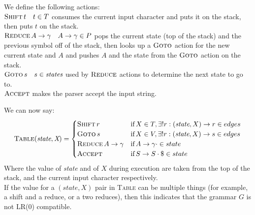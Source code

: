 \documentclass{article}
\begin{document}
	 We define the following actions:\\
	 $\textsc{Shift} \, t \hspace{1em} t \in T$ consumes the current input character and puts it on the stack, then puts $t$ on the stack.\\
	 $\textsc{Reduce} \, A \rightarrow \gamma \hspace{1em} A \rightarrow \gamma \in P$ pops the current state (top of the stack) and the previous symbol off of the stack, then looks up a $\textsc{Goto}$ action for the new current state and $A$ and pushes $A$ and the state from the $\textsc{Goto}$ action on the stack.\\
	 $\textsc{Goto} \, s \hspace{1em} s \in \textit{states}$ used by $\textsc{Reduce}$ actions to determine the next state to go to.\\
	 $\textsc{Accept}$ makes the parser accept the input string.
	 
	 We can now say:
	 $$
	 \textsc{Table}(\textit{state}, \textit{X}) =
	 \begin{cases}
	 \textsc{Shift} \, r & \textrm{if} \, X \in T, \exists! r : (\textit{state}, X) \rightarrow r \in edges\\
	 \textsc{Goto} \, s & \textrm{if} \,  X \in V, \exists! r : (\textit{state}, X) \rightarrow s \in edges\\
	 \textsc{Reduce} \, A \rightarrow \gamma & \textrm{if} \, A \rightarrow \gamma \cdot \in state\\
	 \textsc{Accept} & \textrm{if} \, S \rightarrow S \cdot \$ \in state
	 \end{cases}
	 $$
	 Where the value of \textit{state} and of $X$ during execution are taken from the top of the stack, and the current input character respectively.\\
	 If the value for a $(\textit{state}, X)$ pair in \textsc{Table} can be multiple things (for example, a shift and a reduce, or a two reduces), then this indicates that the grammar $G$ is not LR(0) compatible.
	
\end{document}
